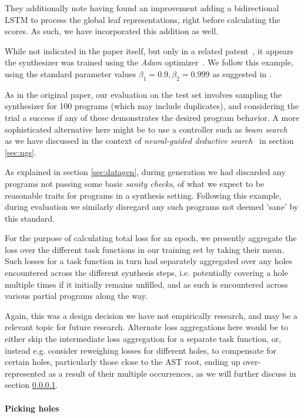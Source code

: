\documentclass{article}
\begin{document}
They additionally note having found an improvement adding a bidirectional LSTM to process the global leaf representations, right before calculating the scores.
As such, we have incorporated this addition as well.

While not indicated in the paper itself,
but only in a related patent~\citep{mohamed2017neural},
it appears the synthesizer was trained using the \emph{Adam} optimizer~\citep{kingma2014adam}.
We follow this example,
using the standard parameter values $\beta_1=0.9, \beta_2=0.999$ as suggested in \citet{kingma2014adam}.

As in the original paper,
our evaluation on the test set involves sampling the synthesizer for 100 programs (which may include duplicates),
and considering the trial a success if any of these demonstrates the desired program behavior.
A more sophisticated alternative here might be to use a controller such as \emph{beam search}~\citep{polosukhin2018neural}
as we have discussed in the context of \emph{neural-guided deductive search}~\citep{deepcoder} in section \ref{sec:ngs}.

As explained in section \ref{sec:datagen},
during generation we had discarded any programs not passing some basic \emph{sanity checks},
of what we expect to be reasonable traits for programs in a synthesis setting.
Following this example, during evaluation we similarly disregard any such programs not deemed 'sane' by this standard.

For the purpose of calculating total loss for an epoch,
we presently aggregate the loss over the different
task functions in our training set by taking their mean.
Such losses for a task function in turn had separately aggregated
over any holes encountered across the different synthesis steps,
i.e. potentially covering a hole multiple times if it initially remains unfilled,
and as such is encountered across various partial programs along the way.

Again, this was a design decision we have not empirically research,
and may be a relevant topic for future research.
Alternate loss aggregations here would be to either
skip the intermediate loss aggregation for a separate task function,
or, instead e.g. consider reweighing losses for different holes,
to compensate for certain holes, particularly those close to the AST root,
ending up over-represented as a result of their multiple occurrences,
as we will further discuss in section \ref{sec:picking}.

\paragraph{Picking holes} \label{sec:picking}
\end{document}
